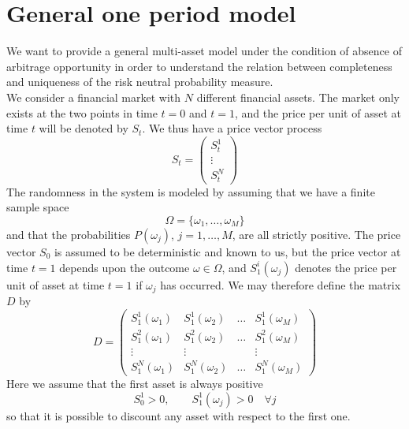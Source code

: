 \section{General one period model} %
We want to provide a general multi-asset model under the condition of absence of arbitrage opportunity in order to understand the relation between completeness and uniqueness of the risk neutral probability measure.\\
We consider a financial market with $N$ different financial assets. The market only exists at the two points in time $t = 0$ and $t = 1$, and the price per unit of asset at time $t$ will be denoted by $S_t$. We thus have a price vector process
\begin{equation*}
    S_t = \left(
    \begin{matrix}
        S_t^1 \\ \vdots \\ S_t^N
    \end{matrix}
    \right)
\end{equation*}
The randomness in the system is modeled by assuming that we have a finite sample space 
\begin{equation*}
    \Omega = \{\omega_1,\dots,\omega_M\}
\end{equation*}
and that the probabilities $P(\omega_j)$, $j=1,\dots,M$, are all strictly positive. The price vector $S_0$ is assumed to be deterministic and known to us, but the price vector at time $t = 1$ depends upon the outcome $\omega\in\Omega$, and $S^i_1(\omega_j)$ denotes the price per unit of asset at time $t = 1$ if $\omega_j$ has occurred. We may therefore define the matrix $D$ by
\begin{equation}
    D = \left(
    \begin{matrix}
    S^1_1(\omega_1) & S^1_1(\omega_2) & \dots & S^1_1(\omega_M) \\
    S^2_1(\omega_1) & S^2_1(\omega_2) & \dots & S^2_1(\omega_M) \\
    \vdots          & \vdots          &       & \vdots          \\
    S^N_1(\omega_1) & S^N_1(\omega_2) & \dots & S^N_1(\omega_M)
    \end{matrix}
    \right)
\end{equation}
Here we assume that the first asset is always positive 
\begin{equation*}
    S_0^1 > 0, \qquad S_1^1(\omega_j) > 0 \quad \forall j
\end{equation*}
so that it is possible to discount any asset with respect to the first one. \\
